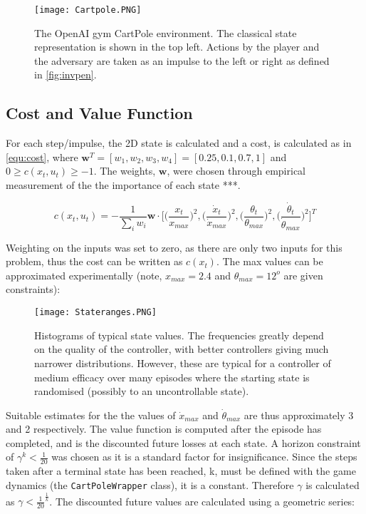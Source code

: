 \documentclass[../main.tex]{subfiles}
\begin{document}
\begin{figure}[H]
   \centering
   \texttt{[image: Cartpole.PNG]}
   \caption{\label{fig:openai} The OpenAI gym CartPole environment. The classical state representation is shown in the top left. Actions by the player and the adversary are taken as an impulse to the left or right as defined in \cref{fig:invpen}.}
\end{figure}

\subsection{Cost and Value Function}

For each step/impulse, the 2D state is calculated and a cost, is calculated as in \cref{equ:cost}, where $\boldsymbol{w}^T = [w_1, w_2, w_3, w_4] = [0.25, 0.1, 0.7, 1]$ and $0 \geq c(x_t, u_t) \geq -1$. The weights, $\boldsymbol{w}$, were chosen through empirical measurement of the the importance of each state ***.

\begin{equation}
   \label{equ:cost}
   c(x_t, u_t) = - \frac{1}{\sum_{i} w_i} \boldsymbol{w} \cdot \bigg[ \Big(\frac{x_t}{x_{max}}\Big)^2,  \Big(\frac{\dot{x}_t}{\dot{x}_{max}}\Big)^2,  \Big(\frac{\theta_t}{\theta_{max}}\Big)^2,  \Big(\frac{\dot{\theta}_t}{\dot{\theta}_{max}}\Big)^2 \bigg]^T
\end{equation}

 Weighting on the inputs was set to zero, as there are only two inputs for this problem, thus the cost can be written as $c(x_t)$. The max values can be approximated experimentally (note, $x_{max} = 2.4$ and $\theta_{max} = 12^o$ are given constraints):

\begin{figure}[H]
   \centering
   \texttt{[image: Stateranges.PNG]}
   \caption{\label{fig:ranges} Histograms of typical state values. The frequencies greatly depend on the quality of the controller, with better controllers giving much narrower distributions. However, these are typical for a controller of medium efficacy over many episodes where the starting state is randomised (possibly to an uncontrollable state).}
\end{figure}

Suitable estimates for the the values of $\dot{x}_{max}$ and $\dot{\theta}_{max}$ are thus approximately 3 and 2 respectively. The value function is computed after the episode has completed, and is the discounted future losses at each state. A horizon constraint of $\gamma^{k} < \frac{1}{20}$ was chosen as it is a standard factor for insignificance. Since the steps taken after a terminal state has been reached, k, must be defined with the game dynamics (the \texttt{CartPoleWrapper} class), it is a constant. Therefore $\gamma$ is calculated as $\gamma < \frac{1}{20}^{\frac{1}{k}}$. The discounted future values are calculated using a geometric series:
\end{document}
